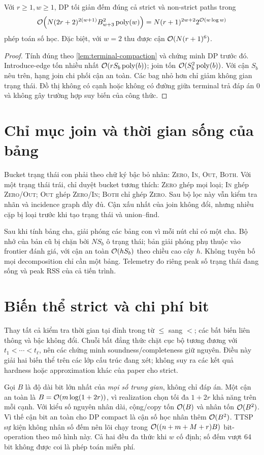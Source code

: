 \begin{theorem}
\label{thm:compact-tw}
Với $r\ge1,w\ge1$, DP tối giản đếm đúng cả strict và non-strict paths trong
\[
 \mathcal{O}\!\left(N(2r+2)^{2(w+1)}B_{w+3}^{2}\operatorname{poly}(w)\right)
 =N(r+1)^{2w+2}2^{\mathcal{O}(w\log w)}
\]
phép toán số học. Đặc biệt, với $w=2$ thu được cận $\mathcal{O}(N(r+1)^6)$.
\end{theorem}

\begin{proof}
Tính đúng theo \cref{lem:terminal-compaction} và chứng minh DP trước đó. Introduce-edge tốn nhiều nhất $\mathcal{O}(rS_b\operatorname{poly}(b))$; join tốn $\mathcal{O}(S_b^2\operatorname{poly}(b))$. Với cận $S_b$ nêu trên, hạng join chi phối cận an toàn. Các bag nhỏ hơn chỉ giảm không gian trạng thái. Đồ thị không có cạnh hoặc không có đường giữa terminal trả đáp án $0$ và không gây trường hợp suy biến của công thức.
\end{proof}

\section{Chỉ mục join và thời gian sống của bảng}

Bucket trạng thái con phải theo chữ ký bậc bỏ nhãn: \textsc{Zero}, \textsc{In}, \textsc{Out}, \textsc{Both}. Với một trạng thái trái, chỉ duyệt bucket tương thích: \textsc{Zero} ghép mọi loại; \textsc{In} ghép \textsc{Zero}/\textsc{Out}; \textsc{Out} ghép \textsc{Zero}/\textsc{In}; \textsc{Both} chỉ ghép \textsc{Zero}. Sau bộ lọc này vẫn kiểm tra nhãn và incidence graph đầy đủ. Cận xấu nhất của join không đổi, nhưng nhiều cặp bị loại trước khi tạo trạng thái và union--find.

Sau khi tính bảng cha, giải phóng các bảng con vì mỗi nút chỉ có một cha. Bộ nhớ của bản cũ bị chặn bởi $NS_b$ ô trạng thái; bản giải phóng phụ thuộc vào frontier đánh giá, với cận an toàn $\mathcal{O}(hS_b)$ theo chiều cao cây $h$. Không tuyên bố mọi decomposition chỉ cần một bảng. Telemetry đo riêng peak số trạng thái đang sống và peak RSS của cả tiến trình.

\section{Biến thể strict và chi phí bit}

Thay tất cả kiểm tra thời gian tại đỉnh trong từ $\le$ sang $<$; các bất biến liên thông và bậc không đổi. Chuỗi bất đẳng thức chặt cục bộ tương đương với $t_1<\cdots<t_\ell$, nên các chứng minh soundness/completeness giữ nguyên. Điều này giải hai biến thể trên các lớp cấu trúc đang xét; không suy ra các kết quả hardness hoặc approximation khác của paper cho strict.

Gọi $B$ là độ dài bit lớn nhất của \emph{mọi số trung gian}, không chỉ đáp án. Một cận an toàn là $B=\mathcal{O}(m\log(1+2r))$, vì realization chọn tối đa $1+2r$ khả năng trên mỗi cạnh. Với kiểu số nguyên nhân dài, cộng/copy tốn $\mathcal{O}(B)$ và nhân tốn $\mathcal{O}(B^2)$. Vì thế cận bit an toàn cho DP compact là cận số học nhân thêm $\mathcal{O}(B^2)$. TTSP sự kiện không nhân số đếm nên lõi chạy trong $\mathcal{O}((n+m+M+r)B)$ bit-operation theo mô hình này. Cả hai đều đa thức khi $w$ cố định; số đếm vượt 64 bit không được coi là phép toán miễn phí.
